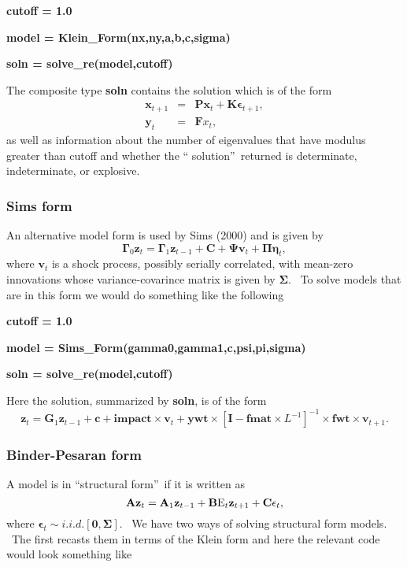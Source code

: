 \documentclass[thmsa,notitlepage,11pt]{article}
\begin{document}
\textbf{cutoff = 1.0}

\textbf{model = Klein\_Form(nx,ny,a,b,c,sigma)}

\textbf{soln = solve\_re(model,cutoff) }

\bigskip

The composite type \textbf{soln} contains the solution which is of the form%
\begin{eqnarray*}
\mathbf{x}_{t+1} &=&\mathbf{Px}_{t}+\mathbf{K\epsilon }_{t+1}, \\
\mathbf{y}_{t} &=&\mathbf{F}x_{t},
\end{eqnarray*}%
as well as information about the number of eigenvalues that have modulus
greater than cutoff and whether the \textquotedblleft
solution\textquotedblright\ returned is determinate, indeterminate, or
explosive.

\subsubsection{Sims form}

An alternative model form is used by Sims (2000) and is given by%
\[
\mathbf{\Gamma }_{0}\mathbf{z}_{t}=\mathbf{\Gamma }_{1}\mathbf{z}_{t-1}+%
\mathbf{C}+\mathbf{\Psi v}_{t}+\mathbf{\Pi \eta }_{t}, 
\]%
where $\mathbf{v}_{t}$ is a shock process, possibly serially correlated,
with mean-zero innovations whose variance-covarince matrix is given by $%
\mathbf{\Sigma }$. \ To solve models that are in this form we would do
something like the following

\bigskip

\textbf{cutoff = 1.0}

\textbf{model = Sims\_Form(gamma0,gamma1,c,psi,pi,sigma)}

\textbf{soln = solve\_re(model,cutoff)}

\bigskip

Here the solution, summarized by \textbf{soln}, is of the form%
\[
\mathbf{z}_{t}=\mathbf{G}_{1}\mathbf{z}_{t-1}+\mathbf{c}+\mathbf{impact}%
\times \mathbf{v}_{t}+\mathbf{ywt}\times \left[ \mathbf{I}-\mathbf{fmat}%
\times L^{-1}\right] ^{-1}\times \mathbf{fwt}\times \mathbf{v}_{t+1}. 
\]

\subsubsection{Binder-Pesaran form}

A model is in \textquotedblleft structural form\textquotedblright\ if it is
written as%
\[
\mathbf{Az}_{t}=\mathbf{A}_{1}\mathbf{z}_{t-1}+\mathbf{B}\text{E}_{t}\mathbf{%
z}_{t+1}+\mathbf{C\epsilon }_{t}, 
\]%
where $\mathbf{\epsilon }_{t}\sim i.i.d.[\mathbf{0},\mathbf{\Sigma }]$. \ We
have two ways of solving structural form models. \ The first recasts them in
terms of the Klein form and here the relevant code would look something like
\end{document}

